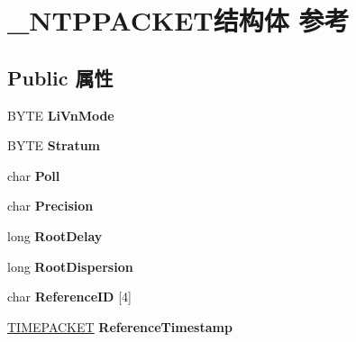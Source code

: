 \hypertarget{struct___n_t_p_p_a_c_k_e_t}{}\section{\+\_\+\+N\+T\+P\+P\+A\+C\+K\+E\+T结构体 参考}
\label{struct___n_t_p_p_a_c_k_e_t}
\subsection*{Public 属性}
\begin{DoxyCompactItemize}
\item 
\mbox{\label{struct___n_t_p_p_a_c_k_e_t_a15d47a9048b5d051d27fbe70ec6cfc2c}} 
B\+Y\+TE {\bfseries Li\+Vn\+Mode}
\item 
\mbox{\label{struct___n_t_p_p_a_c_k_e_t_a454818993fafa0aeefcb1ba6c6cb2bc3}} 
B\+Y\+TE {\bfseries Stratum}
\item 
\mbox{\label{struct___n_t_p_p_a_c_k_e_t_a1854d63f5dcad24ee6e4193e726746d3}} 
char {\bfseries Poll}
\item 
\mbox{\label{struct___n_t_p_p_a_c_k_e_t_a2b72379ddbee50c64ce35b24baa91e7f}} 
char {\bfseries Precision}
\item 
\mbox{\label{struct___n_t_p_p_a_c_k_e_t_ae9617e7bbe85e522892f0cc9dd29f9c6}} 
long {\bfseries Root\+Delay}
\item 
\mbox{\label{struct___n_t_p_p_a_c_k_e_t_a567821c8da4a40447774c37ed7807a1b}} 
long {\bfseries Root\+Dispersion}
\item 
\mbox{\label{struct___n_t_p_p_a_c_k_e_t_aaeb7dff1721ec5356bd11cff33569b92}} 
char {\bfseries Reference\+ID} \mbox{[}4\mbox{]}
\item 
\mbox{\label{struct___n_t_p_p_a_c_k_e_t_a14ee6978b4b8d9471048ae398a1a48b2}} 
\hyperlink{struct___t_i_m_e_p_a_c_k_e_t}{T\+I\+M\+E\+P\+A\+C\+K\+ET} {\bfseries Reference\+Timestamp}
\item 
\mbox{\label{struct___n_t_p_p_a_c_k_e_t_ad97df565f5f242435e825621b219601b}} 

\end{DoxyCompactItemize}
